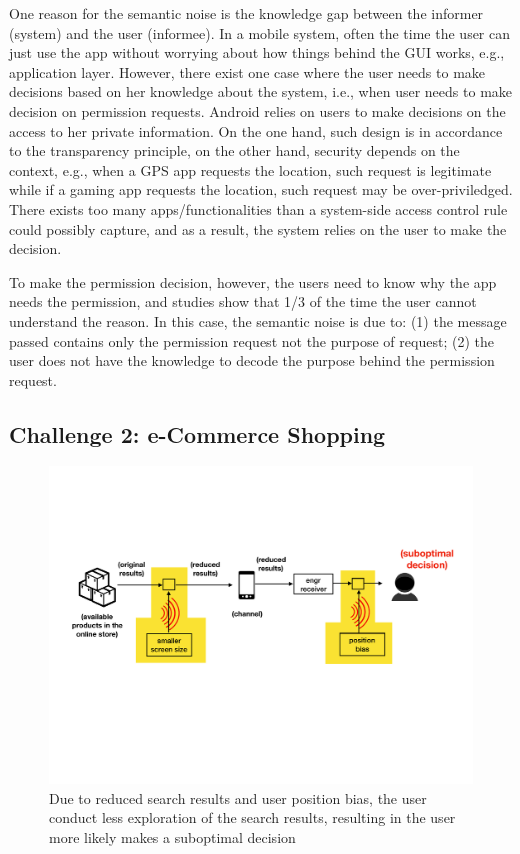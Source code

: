 One reason for the semantic noise is the knowledge gap between the informer (system) and the user (informee). In a mobile system, often the time the user can just use the app without worrying about how things behind the GUI works, e.g., application layer. However, there exist one case where the user needs to make decisions based on her knowledge about the system, i.e., when user needs to make decision on permission requests. Android relies on users to make decisions on the access to her private information. On the one hand, such design is in accordance to the transparency principle, on the other hand, security depends on the context, e.g., when a GPS app requests the location, such request is legitimate while if a gaming app requests the location, such request may be over-priviledged. There exists too many apps/functionalities than a system-side access control rule could possibly capture, and as a result, the system relies on the user to make the decision. 

To make the permission decision, however, the users need to know why the app needs the permission, and studies show that 1/3 of the time the user cannot understand the reason. In this case, the semantic noise is due to: (1) the message passed contains only the permission request not the purpose of request; (2) the user does not have the knowledge to decode the purpose behind the permission request. 

\subsection{Challenge 2: e-Commerce Shopping}


\begin{figure}[h]
\centering
\includegraphics[width=.85\linewidth]{figure/chapter1/gui1_challenge}
\caption{Due to reduced search results and user position bias, the user conduct less exploration of the search results, resulting in the user more likely makes a suboptimal decision\label{fig:ch1:gui1}}
\end{figure} 

